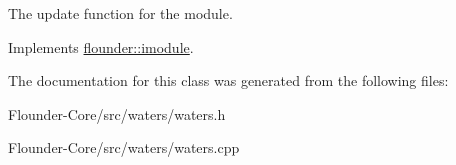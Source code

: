 The update function for the module. 



Implements \hyperlink{classflounder_1_1imodule_a9a53d48a46b5f6b16a92b2cd8503f74a}{flounder\+::imodule}.



The documentation for this class was generated from the following files\+:\begin{DoxyCompactItemize}
\item 
Flounder-\/\+Core/src/waters/waters.\+h\item 
Flounder-\/\+Core/src/waters/waters.\+cpp\end{DoxyCompactItemize}
